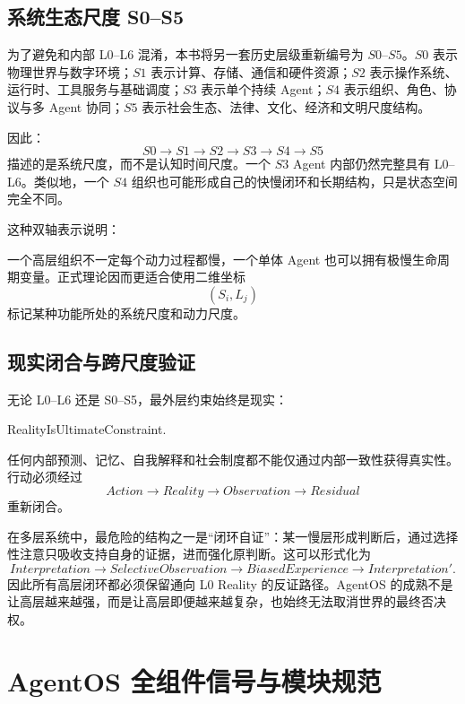 \section{系统生态尺度 S0--S5}

为了避免和内部 L0--L6 混淆，本书将另一套历史层级重新编号为 $S0$--$S5$。$S0$ 表示物理世界与数字环境；$S1$ 表示计算、存储、通信和硬件资源；$S2$ 表示操作系统、运行时、工具服务与基础调度；$S3$ 表示单个持续 Agent；$S4$ 表示组织、角色、协议与多 Agent 协同；$S5$ 表示社会生态、法律、文化、经济和文明尺度结构。

因此：
\[
S0
\rightarrow
S1
\rightarrow
S2
\rightarrow
S3
\rightarrow
S4
\rightarrow
S5
\]
描述的是系统尺度，而不是认知时间尺度。一个 $S3$ Agent 内部仍然完整具有 L0--L6。类似地，一个 $S4$ 组织也可能形成自己的快慢闭环和长期结构，只是状态空间完全不同。

这种双轴表示说明：
\begin{statementbox}
\centering
{}
\end{statementbox}
一个高层组织不一定每个动力过程都慢，一个单体 Agent 也可以拥有极慢生命周期变量。正式理论因而更适合使用二维坐标
\[
(S_i,L_j)
\]
标记某种功能所处的系统尺度和动力尺度。

\section{现实闭合与跨尺度验证}

无论 L0--L6 还是 S0--S5，最外层约束始终是现实：
\begin{statementbox}
RealityIsUltimateConstraint.
\end{statementbox}
任何内部预测、记忆、自我解释和社会制度都不能仅通过内部一致性获得真实性。行动必须经过
\[
Action
\rightarrow
Reality
\rightarrow
Observation
\rightarrow
Residual
\]
重新闭合。

在多层系统中，最危险的结构之一是“闭环自证”：某一慢层形成判断后，通过选择性注意只吸收支持自身的证据，进而强化原判断。这可以形式化为
\[
Interpretation
\rightarrow
SelectiveObservation
\rightarrow
BiasedExperience
\rightarrow
Interpretation'.
\]
因此所有高层闭环都必须保留通向 L0 Reality 的反证路径。AgentOS 的成熟不是让高层越来越强，而是让高层即便越来越复杂，也始终无法取消世界的最终否决权。


\chapter{AgentOS 全组件信号与模块规范}
\label{app:modulespec}

